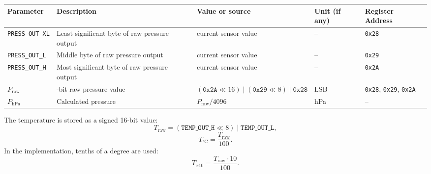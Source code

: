 \begin{table}[H]
	\centering
	\begin{tabularx}{\textwidth}{|>{\raggedright\arraybackslash}p{2.8cm}|>{\raggedright\arraybackslash}X|>{\raggedright\arraybackslash}p{2.8cm}|>{\raggedright\arraybackslash}p{2cm}|>{\raggedright\arraybackslash}p{3cm}|}
		\hline
		\textbf{Parameter}      & \textbf{Description}                                       & \textbf{Value or source}                                               & \textbf{Unit (if any)} & \textbf{Register Address}                   \\ \hline
		\texttt{PRESS\_OUT\_XL} & Least significant byte of raw pressure output              & current sensor value                                                   & --                     & \texttt{0x28}                               \\ \hline
		\texttt{PRESS\_OUT\_L}  & Middle byte of raw pressure output                         & current sensor value                                                   & --                     & \texttt{0x29}                               \\ \hline
		\texttt{PRESS\_OUT\_H}  & Most significant byte of raw pressure output               & current sensor value                                                   & --                     & \texttt{0x2A}                               \\ \hline
		\(P_{\mathrm{raw}}\)    & 24-bit raw pressure value                                  & \((\texttt{0x2A} \ll 16)\;|\;(\texttt{0x29} \ll 8)\;|\;\texttt{0x28}\) & LSB                    & \texttt{0x28}, \texttt{0x29}, \texttt{0x2A} \\ \hline
		\(P_{\mathrm{hPa}}\)    & Calculated pressure                                        & \(P_{\mathrm{raw}} / 4096\)                                            & hPa                    & --                                          \\ \hline
	\end{tabularx}
\end{table}

The temperature is stored as a signed 16-bit value:
\[
	T_{\mathrm{raw}} = (\texttt{TEMP\_OUT\_H} \ll 8)\;|\;\texttt{TEMP\_OUT\_L},
\]
\[
	T_{^\circ\mathrm{C}} = \frac{T_{\mathrm{raw}}}{100}.
\]
In the implementation, tenths of a degree are used:
\[
	T_{x10} = \frac{T_{\mathrm{raw}}\cdot 10}{100}.
\]

